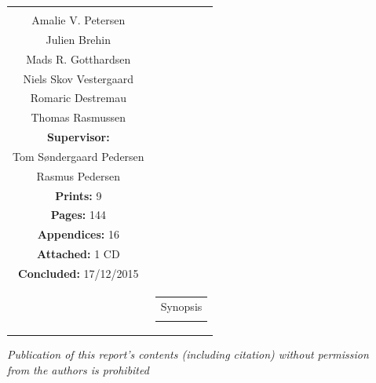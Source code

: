 \begin{titlepage}
\begin{nopagebreak}
{\begin{tabular}{cc}
{{\textbf{Participants:}\\
Amalie V. Petersen\\
Julien Brehin\\
Mads R. Gotthardsen\\
Niels Skov Vestergaard\\
Romaric Destremau\\
Thomas Rasmussen\\

\textbf{Supervisor:}\\
Tom Søndergaard Pedersen\\ %
Rasmus Pedersen
}\\

\textbf{Prints:} 9\\ %
\textbf{Pages:} 144\\ %
\textbf{Appendices:} 16\\ %
\textbf{Attached:} 1 CD\\
\textbf{Concluded:} 17/12/2015\\

\vfill } &
\parbox{7cm}{
  \vspace{.15cm}
  \hfill 
  \begin{tabular}{l}
  {Synopsis}\bigskip \\
  \fbox{
    \parbox{6.5cm}{\bigskip
     {\vfill{\small 
     \bigskip}}
     }}
   \end{tabular}}
\end{tabular}} %

\textit{\phantom{A}Publication of this report's contents (including citation) without permission\\ \phantom{A}from the authors is prohibited}\\

\end{nopagebreak}
\end{titlepage}
%